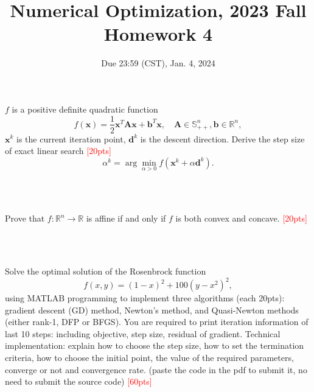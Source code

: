 \documentclass[10pt]{article}
\newenvironment{problem}[2][Problem]{\begin{trivlist}
\item[\hskip \labelsep {\bfseries #1}\hskip \labelsep {\bfseries #2.}]}{\end{trivlist}}
\begin{document}
\title{	Numerical Optimization, 2023 Fall\\Homework 4}
\date{Due 23:59 (CST), Jan. 4, 2024 }
\maketitle


\begin{problem}{1}
    $f$ is a positive definite quadratic function $$f(\pmb x) = \frac{1}{2}\pmb x^T\pmb A\pmb x + \pmb b^T\pmb x,  \quad \pmb A \in \mathbb{S}_{++}^n, \pmb b \in \mathbb{R}^n,$$ $\pmb x^k$ is the current iteration point, $\pmb d^k$ is the descent direction. Derive the step size of exact linear search \textcolor{red}{[20pts]} $$\alpha^k = \arg\min_{\alpha > 0}f(\pmb x^k + \alpha \pmb d^k).$$
\end{problem}
~\\
~\\



\pagebreak\begin{problem}{2}
    Prove that $f: \mathbb{R}^n \rightarrow \mathbb{R}$ is affine if and only if $f$ is both convex and concave. \textcolor{red}{[20pts]} 
\end{problem}
~\\
~\\


\pagebreak\begin{problem}{3}
    Solve the optimal solution of the Rosenbrock function $$f(x, y) = (1 - x)^2 + 100(y - x^2)^2, $$ using MATLAB programming to implement three algorithms (each 20pts): gradient descent (GD) method, Newton's method, and Quasi-Newton methods (either rank-1, DFP or BFGS). You are required to print iteration information of last 10 steps: including objective, step size, residual of gradient. Technical implementation: explain how to choose the step size, how to set the termination criteria, how to choose the initial point, the value of the required parameters, converge or not and convergence rate. (paste the code in the pdf to submit it, no need to submit the source code) \textcolor{red}{[60pts]}
\end{problem}
~\\
~\\

	
\end{document}
